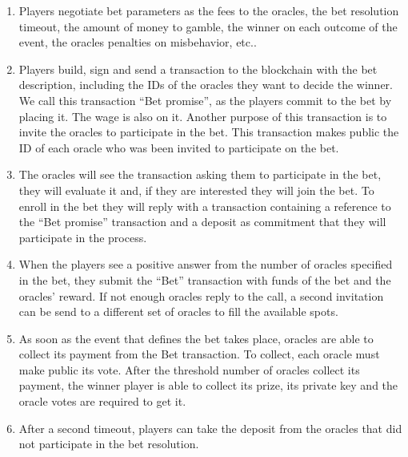 \begin{enumerate}
  \item Players negotiate bet parameters as the fees to the oracles, the bet
      resolution timeout, the amount of money to gamble, the winner on each
      outcome of the event, the oracles penalties on misbehavior, etc..
  \item Players build, sign and send a transaction to the blockchain with the
      bet description, including the IDs of the oracles they want to decide the
      winner.
    We call this transaction ``Bet promise'', as the players commit to the bet
      by placing it. The wage is also on it.
    Another purpose of this transaction is to invite the oracles to participate
      in the bet.
    This transaction makes public the ID of each oracle who was been invited
      to participate on the bet.
  \item The oracles will see the transaction asking them to participate in the
      bet, they will evaluate it and, if they are interested they will join the
      bet.
    To enroll in the bet they will reply with a transaction containing a
      reference to the ``Bet promise'' transaction and a deposit as commitment
      that they will participate in the process.
  \item When the players see a positive answer from the number of oracles
      specified in the bet, they submit the ``Bet'' transaction with funds of
      the bet and the oracles' reward.
  	If not enough oracles reply to the call, a second invitation can be send to
  	  a different set of oracles to fill the available spots.
  \item As soon as the event that defines the bet  takes place, oracles are able
      to collect its payment from the Bet transaction.
      To collect, each oracle must make public its vote.
  	After the threshold number of oracles collect its payment, the winner player
  	  is able to collect its prize, its private key and the oracle votes are
  	  required to get it.
  \item After a second timeout, players can take the deposit from the oracles
  	  that did not participate in the bet resolution.
\end{enumerate}

